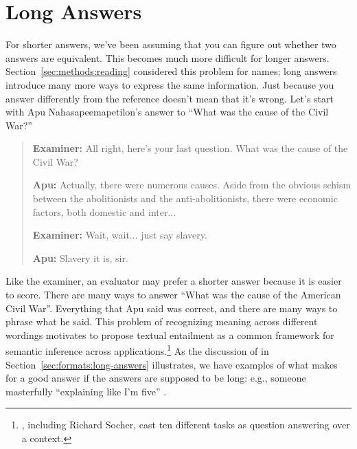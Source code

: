 \section{Long Answers}
\label{sec:methods:long-answers}

For shorter answers, we've been assuming that you can figure out whether two answers are equivalent.  This becomes much more difficult for longer answers.
Section~\ref{sec:methods:reading} considered this problem for names; long answers introduce many more ways to express the same information.
Just because you answer differently from the reference doesn't mean that it's wrong.  Let's start with Apu Nahasapeemapetilon's answer to ``What was the cause of the  Civil War?''

\begin{quote}
\textbf{Examiner:} All right, here's your last question. What was the cause of the Civil War?

\textbf{Apu:} Actually, there were numerous causes. Aside from the obvious schism between the abolitionists and the anti-abolitionists, there were economic factors, both domestic and inter...

\textbf{Examiner:} Wait, wait... just say slavery.

\textbf{Apu:} Slavery it is, sir.
\end{quote}

Like the examiner, an evaluator may prefer a shorter answer because it is easier to score.   There are many ways to answer ``What was the cause of the American Civil War''.  Everything that Apu said was correct, and there are many ways to phrase what he said.  This problem of recognizing meaning across different wordings motivates \citet{dagan-glickman-04} to propose textual entailment as a common framework for semantic inference across  applications.\footnote{\citet{mccann-18-decathlon}, including Richard Socher, cast ten different  tasks as question answering over a context.}  As the discussion of  in Section~\ref{sec:formats:long-answers} illustrates, we have examples of what makes for a good answer if the answers are supposed to be long: e.g., someone masterfully ``explaining like I'm five'' .


